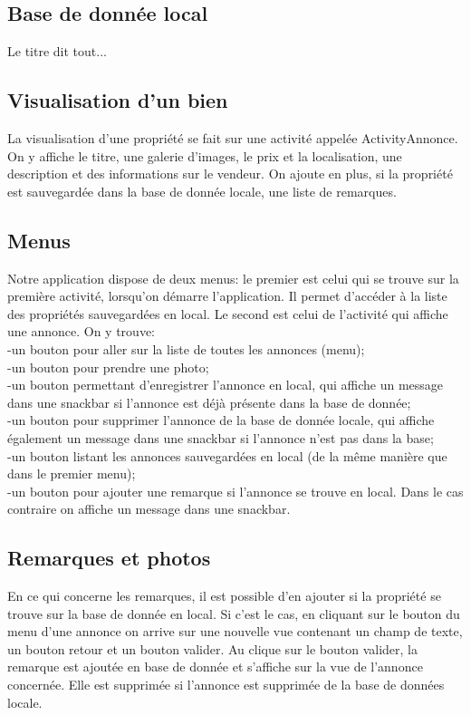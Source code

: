 \documentclass[a4paper,12pt]{article} %
\begin{document}
\subsection{Base de donnée local}
Le titre dit tout...

\subsection{Visualisation d'un bien}
La visualisation d'une propriété se fait sur une activité appelée ActivityAnnonce.
On y affiche le titre, une galerie d'images, le prix et la localisation, une description et des informations sur le vendeur. On ajoute en plus, si la propriété est sauvegardée dans la base de donnée locale, une liste de remarques.

\subsection{Menus}
Notre application dispose de deux menus: le premier est celui qui se trouve sur la première activité, lorsqu'on démarre l'application. Il permet d'accéder à la liste des propriétés sauvegardées en local. Le second est celui de l'activité qui affiche une annonce. On y trouve:\\
    -un bouton pour aller sur la liste de toutes les annonces (menu);\\
    -un bouton pour prendre une photo;\\
    -un bouton permettant d'enregistrer l'annonce en local, qui affiche un message dans une snackbar si l'annonce est déjà présente dans la base de donnée;\\
    -un bouton pour supprimer l'annonce de la base de donnée locale, qui affiche également un message dans une snackbar si l'annonce n'est pas dans la base;\\
    -un bouton listant les annonces sauvegardées en local (de la même manière que dans le premier menu);\\
    -un bouton pour ajouter une remarque si l'annonce se trouve en local. Dans le cas contraire on affiche un message dans une snackbar.

\subsection{Remarques et photos}
En ce qui concerne les remarques, il est possible d'en ajouter si la propriété se trouve sur la base de donnée en local. Si c'est le cas, en cliquant sur le bouton du menu d'une annonce on arrive sur une nouvelle vue contenant un champ de texte, un bouton retour et un bouton valider.
Au clique sur le bouton valider, la remarque est ajoutée en base de donnée et s'affiche sur la vue de l'annonce concernée. Elle est supprimée si l'annonce est supprimée de la base de données locale.
\vspace{1cm}
\end{document}
